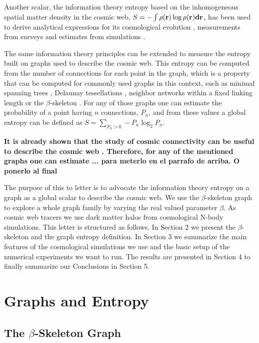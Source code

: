 \documentclass[fleqn,usenatbib]{mnras}
\begin{document}
Another scalar, the information theory entropy based on the inhomogeneous 
spatial matter density in the cosmic web,
$S=-\int\rho(\bf{r})\log\rho(\bf{r}) d\bf{r}$, has
been used to derive analytical expressions for its cosmological evolution
\citep{2004PhRvL..92n1302H}, measurements from surveys
\citep{2015MNRAS.454.2647P}
and estimates from simulations \citep{2020MNRAS.491.5447V}.

The same information theory principles can be extended to measure the entropy built 
on graphs  used to describe the cosmic web. 
This entropy can be computed from the number of connections for each point in the graph, 
which is a property that  can be computed for commonly used graphs in this context, such as  minimal spanning trees \citep{1985MNRAS.216...17B}, Delaunay tessellations \citep{2007MNRAS.382....2R}, neighbor networks within a fixed linking length \citep{2016MNRAS.459.2690H} or the $\beta$-skeleton \citep{2019MNRAS.485.5276F}. 
For any of those graphs one can estimate the probability of a point having $n$ connections, $P_n$, and from these values a global entropy can be defined as $S = \sum_{P_n>0}-P_n\log_2{P_n}$.


\textbf{It is already shown that the study of cosmic connectivity can be useful to describe the cosmic web \citep{10.1093/mnras/stz3535}.  Therefore, for any of the mentioned graphs one can estimate ... para meterlo en el parrafo de arriba. O ponerlo al final}

The purpose of this to letter is to advocate the information theory entropy on a graph
as a global scalar to describe the cosmic web.
We use the $\beta$-skeleton graph to explore a whole graph family 
by varying the real valued parameter $\beta$.
As cosmic web tracers we use dark matter halos from cosmological N-body simulations. 
This letter is structured as follows. 
In Section 2 we present the $\beta$-skeleton and the graph entropy definition.
In Section 3 we summarize the main features of the cosmological simulations we use and 
the basic setup of the numerical experiments we want to run.
The results are presented in Section 4 to finally summarize our Conclusions in Section 5.

\section{Graphs and Entropy}

\subsection{The $\beta$-Skeleton Graph}
\end{document}
